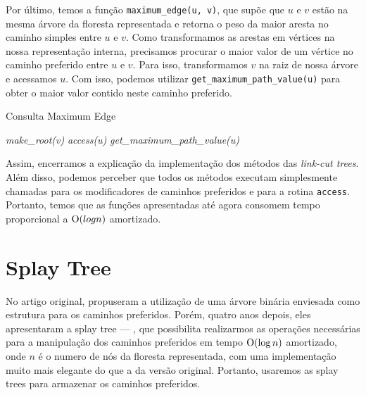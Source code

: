 Por último, temos a função \texttt{maximum\_edge(u, v)}, que supõe que $u$ e $v$ estão na mesma árvore da floresta representada e retorna o peso da maior aresta no caminho simples entre $u$ e $v$. Como transformamos as arestas em vértices na nossa representação interna, precisamos procurar o maior valor de um vértice no caminho preferido entre $u$ e $v$. Para isso, transformamos $v$ na raiz de nossa árvore e acessamos $u$. Com isso, podemos utilizar \texttt{get\_maximum\_path\_value(u)} para obter o maior valor contido neste caminho preferido.

\begin{algorithm}[h!]
    \caption{Consulta Maximum Edge}\label{lct:max-edge}
    \begin{algorithmic}[1]
        \State \emph{make\_root(v)}
        \State \emph{access(u)}
        \State \Return \emph{get\_maximum\_path\_value(u)}
        \EndFunction
    \end{algorithmic}
\end{algorithm}

Assim, encerramos a explicação da implementação dos métodos das \emph{link-cut trees}. Além disso, podemos perceber que todos os métodos executam simplesmente chamadas para os modificadores de caminhos preferidos e para a rotina \texttt{access}. Portanto, temos que as funções apresentadas até agora consomem tempo proporcional a $\mathrm{O}(log n)$ amortizado.

\section{Splay Tree}
\label{sec:lct-splay-trees}

No artigo original, \citet{10.1145/800076.802464} propuseram a utilização de uma árvore binária enviesada como estrutura para os caminhos preferidos. Porém, quatro anos depois, eles apresentaram a splay tree --- \citet{10.1145/3828.3835}, que possibilita realizarmos as operações necessárias para a manipulação dos caminhos preferidos em tempo $\mathrm{O}(\log n)$ amortizado, onde $n$ é o numero de nós da floresta representada, com uma implementação muito mais elegante do que a da versão original. Portanto, usaremos as splay trees para armazenar os caminhos preferidos.

